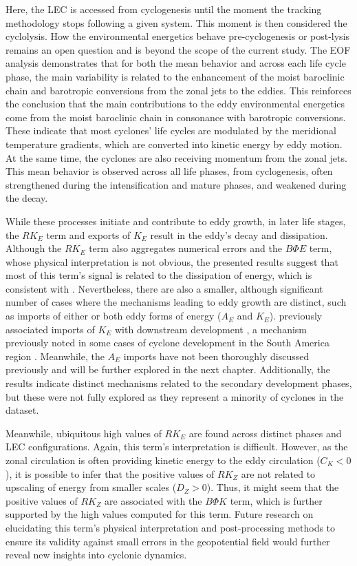 Here, the LEC is accessed from cyclogenesis until the moment the tracking methodology stops following a given system. This moment is then considered the cyclolysis. How the environmental energetics behave pre-cyclogenesis or post-lysis remains an open question and is beyond the scope of the current study. The EOF analysis demonstrates that for both the mean behavior and across each life cycle phase, the main variability is related to the enhancement of the moist baroclinic chain and barotropic conversions from the zonal jets to the eddies. This reinforces the conclusion that the main contributions to the eddy environmental energetics come from the moist baroclinic chain in consonance with barotropic conversions. These indicate that most cyclones' life cycles are modulated by the meridional temperature gradients, which are converted into kinetic energy by eddy motion. At the same time, the cyclones are also receiving momentum from the zonal jets. This mean behavior is observed across all life phases, from cyclogenesis, often strengthened during the intensification and mature phases, and weakened during the decay. 

While these processes initiate and contribute to eddy growth, in later life stages, the $RK_E$ term and exports of $K_E$ result in the eddy's decay and dissipation. Although the $RK_E$ term also aggregates numerical errors and the $B\Phi E$ term, whose physical interpretation is not obvious, the presented results suggest that most of this term's signal is related to the dissipation of energy, which is consistent with \citet{smith1980energetics}. Nevertheless, there are also a smaller, although significant number of cases where the mechanisms leading to eddy growth are distinct, such as imports of either or both eddy forms of energy ($A_E$ and $K_E$). \citet{michaelides1999quasi} previously associated imports of $K_E$ with downstream development \citep{simmons1979downstream}, a mechanism previously noted in some cases of cyclone development in the South America region \citep{piva2010energetics, rosa2013energetics}. Meanwhile, the $A_E$ imports have not been thoroughly discussed previously and will be further explored in the next chapter. Additionally, the results indicate distinct mechanisms related to the secondary development phases, but these were not fully explored as they represent a minority of cyclones in the dataset.

Meanwhile, ubiquitous high values of $RK_E$ are found across distinct phases and LEC configurations. Again, this term's interpretation is difficult. However, as the zonal circulation is often providing kinetic energy to the eddy circulation ($C_K < 0$), it is possible to infer that the positive values of $RK_Z$ are not related to upscaling of energy from smaller scales ($D_Z > 0$). Thus, it might seem that the positive values of $RK_Z$ are associated with the $B\Phi K$ term, which is further supported by the high values computed for this term. Future research on elucidating this term's physical interpretation and post-processing methods to ensure its validity against small errors in the geopotential field would further reveal new insights into cyclonic dynamics.

